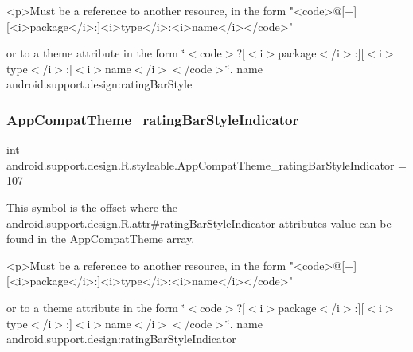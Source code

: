 \begin{DoxyVerb}      <p>Must be a reference to another resource, in the form "<code>@[+][<i>package</i>:]<i>type</i>:<i>name</i></code>"
\end{DoxyVerb}
 or to a theme attribute in the form \char`\"{}$<$code$>$?\mbox{[}$<$i$>$package$<$/i$>$\+:\mbox{]}\mbox{[}$<$i$>$type$<$/i$>$\+:\mbox{]}$<$i$>$name$<$/i$>$$<$/code$>$\char`\"{}.  name android.\+support.\+design\+:rating\+Bar\+Style \mbox{\label{classandroid_1_1support_1_1design_1_1R_1_1styleable_acb5f552d97fb774eb23c5a37ac305002}} 
\subsubsection{\texorpdfstring{App\+Compat\+Theme\+\_\+rating\+Bar\+Style\+Indicator}{AppCompatTheme\_ratingBarStyleIndicator}}
{\footnotesize\ttfamily int android.\+support.\+design.\+R.\+styleable.\+App\+Compat\+Theme\+\_\+rating\+Bar\+Style\+Indicator = 107\hspace{0.3cm}{\ttfamily [static]}}

This symbol is the offset where the \hyperlink{classandroid_1_1support_1_1design_1_1R_1_1attr_a3aa9f493418e2936285f232cc189efa5}{android.\+support.\+design.\+R.\+attr\#rating\+Bar\+Style\+Indicator} attribute\textquotesingle{}s value can be found in the \hyperlink{classandroid_1_1support_1_1design_1_1R_1_1styleable_afb351dc8de20cbd4c89abe360373010c}{App\+Compat\+Theme} array.

\begin{DoxyVerb}      <p>Must be a reference to another resource, in the form "<code>@[+][<i>package</i>:]<i>type</i>:<i>name</i></code>"
\end{DoxyVerb}
 or to a theme attribute in the form \char`\"{}$<$code$>$?\mbox{[}$<$i$>$package$<$/i$>$\+:\mbox{]}\mbox{[}$<$i$>$type$<$/i$>$\+:\mbox{]}$<$i$>$name$<$/i$>$$<$/code$>$\char`\"{}.  name android.\+support.\+design\+:rating\+Bar\+Style\+Indicator \mbox{\label{classandroid_1_1support_1_1design_1_1R_1_1styleable_a2d2923d5071be320451a0bd71d92c8f6}} 
